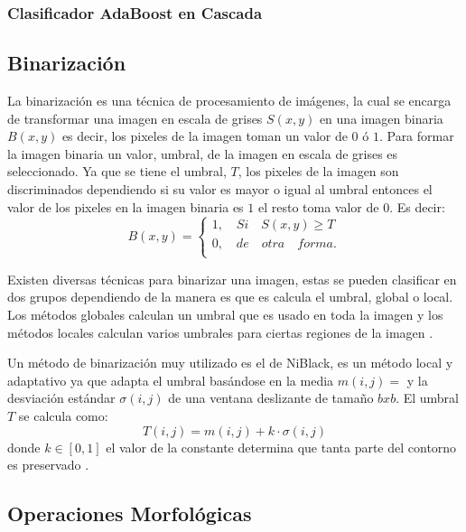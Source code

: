 \subsubsection{Clasificador AdaBoost en Cascada}\label{sssec:AdaboostCascade}   



\subsection{Binarización}\label{subsec:Binarization} 

La binarización es una técnica de procesamiento de imágenes, la cual se encarga de transformar una imagen en escala de grises $S(x,y)$ en una imagen binaria $B(x,y)$ es decir, los pixeles de la imagen toman un valor de $0$ ó $1$.   
Para formar la imagen binaria un valor, umbral, de la imagen en escala de grises es seleccionado. Ya que se tiene el umbral, $T$,     
los pixeles de la imagen son discriminados dependiendo si su valor es mayor o igual al umbral entonces el valor de los pixeles en la imagen binaria es $1$ el resto toma valor de $0$. Es decir: 
$$B(x,y)=
\begin{cases}   
1, \quad Si \quad S(x,y)\geq T \\
0, \quad de \quad otra \quad forma.\\
\end{cases}$$

Existen diversas técnicas para binarizar una imagen, estas se pueden clasificar en dos grupos dependiendo de la manera es que es calcula el umbral, global o local. Los métodos globales calculan un umbral que es usado en toda la imagen y los métodos locales calculan varios umbrales para ciertas regiones de la imagen \citep{Chaki2014}.  

Un método de binarización muy utilizado es el de NiBlack,\citep{Niblack1985} es un método local y adaptativo ya que adapta el umbral basándose en la media $m(i,j)=$ y la desviación estándar $\sigma(i,j)$ de una ventana deslizante de tamaño $bxb$. El umbral $T$  se calcula como: 
$$T(i,j)=m(i,j)+k \cdot \sigma(i,j)$$ 
donde $k \in [0,1]$ el valor de la constante determina que tanta parte del contorno es preservado \citep{Chaki2014}.


  
\subsection{Operaciones Morfológicas}\label{subsec:OperacionesMorfologicas} 

